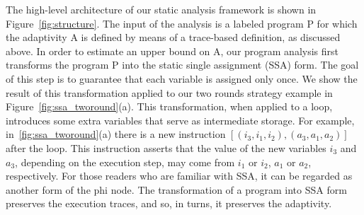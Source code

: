 The high-level architecture of our static analysis framework is shown in 
 Figure~\ref{fig:structure}. The input of the analysis is a labeled program P for which the adaptivity A is defined by means of a trace-based definition, as discussed above. In order to estimate an upper bound on A, our program analysis first transforms the program P into the static single assignment (SSA) form. The goal of this step is to guarantee that each variable is assigned only once. We show the result of this transformation applied to our two rounds strategy example in Figure~\ref{fig:ssa_tworound}(a). 
 This transformation, when applied to a loop, introduces some extra variables that serve as intermediate storage. For example, in~\ref{fig:ssa_tworound}(a) there is a new instruction $[(i_3,i_1,i_2),(a_3,a_1,a_2)]$ after the loop. This instruction asserts that the value of the new variables $i_3$ and $a_3$, depending on the execution step, may come from $i_1$ or $i_2$, $a_1$ or $a_2$, respectively.  For those readers who are familiar with SSA, it can be regarded as another form of the phi node. The transformation of a program into SSA form preserves the execution traces, and so, in turns, it preserves the adaptivity. 

